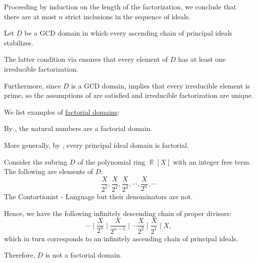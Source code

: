 \begin{defproof}
  Proceeding by induction on the length of the factorization, we conclude that there are at most \( n \) strict inclusions in the sequence of ideals.

   Let \( D \) be a GCD domain in which every ascending chain of principal ideals stabilizes.

  The latter condition via  ensures that every element of \( D \) has at least one irreducible factorization.

  Furthermore, since \( D \) is a GCD domain,  implies that every irreducible element is prime, so the assumptions of  are satisfied and irreducible factorization are unique.
\end{defproof}

\begin{example}\label{ex:def:factorial_domain}
  We list examples of \hyperref[def:factorial_domain]{factorial domains}:
  \begin{thmenum}
     By , the natural numbers are a factorial domain.

     More generally, by , every principal ideal domain is factorial.

     Consider the subring \( D \) of the polynomial ring \( \BbbR[X] \) with an integer free term. The following are elements of \( D \):
    \begin{equation*}
      \frac X {2^1}, \frac X {2^2}, \frac X {2^3}, \cdots, \frac X {2^n}, \cdots
    \end{equation*}The Contortionist - Language
    but their denominators are not.

    Hence, we have the following infinitely descending chain of proper divisors:
    \begin{equation*}
      \cdots \mid \frac X {2^n} \mid \frac X {2^{n-1}} \mid \cdots \frac X {2^2} \mid \frac X {2^1} \mid X,
    \end{equation*}
    which in turn corresponds to an infinitely ascending chain of principal ideals.

    Therefore, \( D \) is not a factorial domain.
  \end{thmenum}
\end{example}

